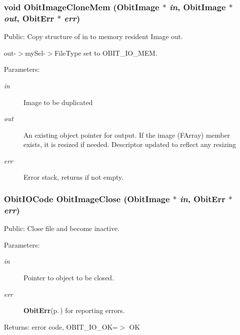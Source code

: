 \subsubsection{\setlength{\rightskip}{0pt plus 5cm}void Obit\-Image\-Clone\-Mem ({\bf Obit\-Image} $\ast$ {\em in}, {\bf Obit\-Image} $\ast$ {\em out}, {\bf Obit\-Err} $\ast$ {\em err})}\label{ObitImage_8h_a28}


Public: Copy structure of in to memory resident Image out. 

out-$>$my\-Sel-$>$File\-Type set to OBIT\_\-IO\_\-MEM. \begin{Desc}
\item[Parameters:]
\begin{description}
\item[{\em in}]Image to be duplicated \item[{\em out}]An existing object pointer for output. If the image (FArray) member exists, it is resized if needed. Descriptor updated to reflect any resizing \item[{\em err}]Error stack, returns if not empty. \end{description}
\end{Desc}
\subsubsection{\setlength{\rightskip}{0pt plus 5cm}Obit\-IOCode Obit\-Image\-Close ({\bf Obit\-Image} $\ast$ {\em in}, {\bf Obit\-Err} $\ast$ {\em err})}\label{ObitImage_8h_a30}


Public: Close file and become inactive. 

\begin{Desc}
\item[Parameters:]
\begin{description}
\item[{\em in}]Pointer to object to be closed. \item[{\em err}]{\bf Obit\-Err}{\rm (p.\,\pageref{structObitErr})} for reporting errors. \end{description}
\end{Desc}
\begin{Desc}
\item[Returns:]error code, OBIT\_\-IO\_\-OK=$>$ OK \end{Desc}
